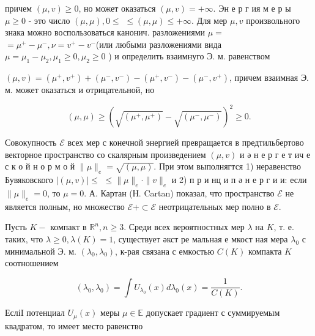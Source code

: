 \documentclass[10pt]{article}
\begin{document}
причем $(\mu, v) \geqslant 0$, но может оказаться $(\mu, v)=+\infty$. Эн е р г ия м е р ы $\mu \geqslant 0$ - это число $(\mu, \mu), 0 \leqslant$ $\leqslant(\mu, \mu) \leqslant+\infty$. Для мер $\mu, v$ произвольного знака можно воспользоваться канонич. разложениями $\mu=$ $=\mu^{+}-\mu^{-}, \nu=v^{+}-v^{-}$(или любыми разложениями вида $\mu=\mu_{1}-\mu_{2}, \mu_{1} \geqslant 0, \mu_{2} \geqslant 0$ ) и определить взаимнуго Э. м. равенством



$(\mu, v)=\left(\mu^{+}, v^{+}\right)+\left(\mu^{-}, v^{-}\right)-\left(\mu^{+}, v^{-}\right)-\left(\mu^{-}, v^{+}\right)$, причем взаимная Э. м. может оказаться и отрицательной, но



\[

(\mu, \mu) \geqslant\left(\sqrt{\left(\mu^{+}, \mu^{+}\right)}-\sqrt{\left(\mu^{-}, \mu^{-}\right)}\right)^{2} \geqslant 0 .

\]



Совокупность $\mathscr{E}$ всех мер с конечной энергией превращается в предтильбертово векторное пространство со скалярным произведением $(\mu, v)$ и ә н е р г е т ич е с к о й н о р м о й $\|\mu\|_{e}=\sqrt{(\mu, \mu)}$. При этом выполнягтся 1) неравенство Бувяковского $|(\mu, v)| \leqslant$ $\leqslant\|\mu\|_{e} \cdot\|v\|_{e}$ и 2) п р и нц и п ә н е р г и и: если $\|\mu\|_{e}=0$, то $\mu=0$. А. Картан (Н. Cartan) показал, что пространство $\mathscr{E}$ не является полным, но множество $\mathscr{E}+\subset \mathscr{E}$ неотрицательных мер полно в $\mathscr{E}$.



Пусть $K-$ компакт в $\mathbb{R}^{n}, n \geqslant 3$. Среди всех вероятностных мер $\lambda$ на $K$, т. е. таких, что $\lambda \geqslant 0, \lambda(K)=1$, существует әкст ре мальная е мкост ная мера $\lambda_{0}$ с минимальной Э. м. $\left(\lambda_{0}, \lambda_{0}\right)$, к-рая связана с емкостью $C(K)$ компакта $K$ соотношением



\[

\left(\lambda_{0}, \lambda_{0}\right)=\int U_{\lambda_{0}}(x) d \lambda_{0}(x)=\frac{1}{C(K)} .

\]



ЕсліI потенциал $U_{\mu}(x)$ меры $\mu \in \mathbb{E}$ допускает градиент с суммируемым квадратом, то имеет место равенство
\end{document}
